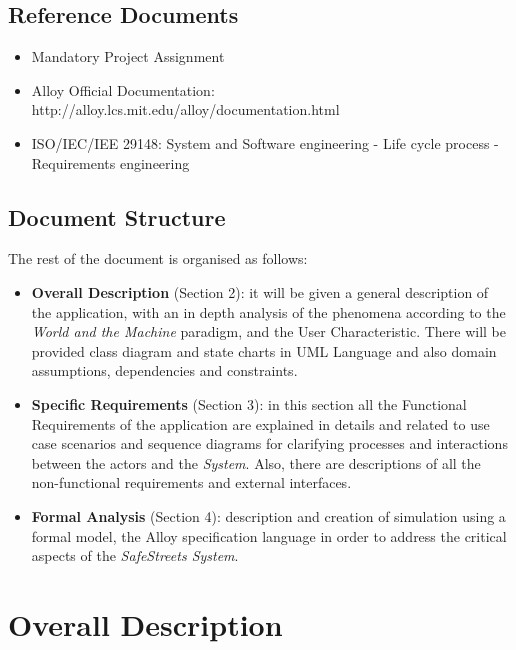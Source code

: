 \documentclass {article}
\begin{document}
	\subsection{Reference Documents}
		
		\begin{itemize}
			 \item Mandatory Project Assignment
			 \item Alloy Official Documentation: http://alloy.lcs.mit.edu/alloy/documentation.html
			 \item ISO/IEC/IEE 29148: System and Software engineering - Life cycle process - Requirements engineering
		\end{itemize}

	\subsection{Document Structure}
			The rest of the document is organised as follows:
				\begin{itemize}
					\item {\bf Overall Description} (Section 2): it will be given a general description of the application, with an in depth analysis of the phenomena according to the {\it World and the Machine} paradigm, and the User Characteristic. There will be provided class diagram and state charts in UML Language and also domain assumptions, dependencies and constraints.
					\item {\bf Specific Requirements} (Section 3): in this section all the Functional Requirements of the application are explained in details and related to use case scenarios and sequence diagrams for clarifying processes and interactions between the actors and the {\it System}. Also, there are descriptions of all the non-functional requirements and external interfaces.
					\item {\bf Formal Analysis} (Section 4): description and creation of simulation using a formal model, the Alloy specification language in order to address the critical aspects of the {\it SafeStreets System}.				
					\end{itemize}

\pagebreak	
	
\section{Overall Description}
\end{document}
